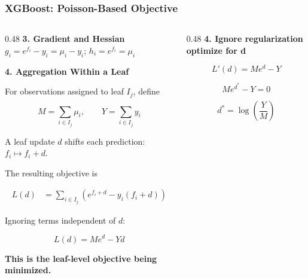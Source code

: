 \documentclass{beamer}
\begin{document}
\begin{frame}
    \frametitle{XGBoost: Poisson-Based Objective}

     \small
    \setlength{\abovedisplayskip}{4pt}
    \setlength{\belowdisplayskip}{4pt}
    \setlength{\abovedisplayshortskip}{2pt}
    \setlength{\belowdisplayshortskip}{2pt}
    \begin{columns}[T,onlytextwidth]

        

        \begin{column}{0.48\textwidth}
            \textbf{3. Gradient and Hessian}
            $g_i = e^{f_i}-y_i = \mu_i-y_i$; 
            $h_i = e^{f_i} = \mu_i$

            \vspace{0.3cm}
            \textbf{4. Aggregation Within a Leaf}

            For observations assigned to leaf \(I_j\), define

            \[
                M = \sum_{i\in I_j} \mu_i,
                \qquad
                Y = \sum_{i\in I_j} y_i
            \]

            A leaf update \(d\) shifts each prediction:
            \(f_i \mapsto f_i+d\).

            The resulting objective is

            \[
                \begin{aligned}
                L(d)
                &= \sum_{i\in I_j}
                \left(e^{f_i+d}-y_i(f_i+d)\right)
                \end{aligned}
            \]

            Ignoring terms independent of \(d\):

            \[
                \boxed{
                L(d)=Me^d-Yd
                }
            \]

            \textbf{This is the leaf-level objective
            being minimized.}
        \end{column}

        \begin{column}{0.48\textwidth}
            \textbf{4. Ignore regularization optimize for d}

            \[
                L'(d)=Me^d-Y 
            \]

            \[
                Me^{d^{*}}-Y = 0
            \]
            
            \[d^* = \log(\frac{Y}{M})\]


\end{column}
\end{columns}
\end{frame}
\end{document}
